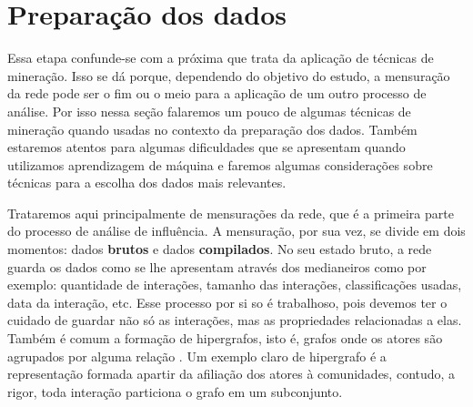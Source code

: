 \chapter{Preparação dos dados}
\label{ch:preparacao}

Essa etapa confunde-se com a próxima que trata da aplicação de técnicas de
mineração. Isso se dá porque, dependendo do objetivo do estudo, a mensuração da
rede pode ser o fim ou o meio para a aplicação de um outro processo de análise.
Por isso nessa seção falaremos um pouco de algumas técnicas de mineração quando
usadas no contexto da preparação dos dados. Também estaremos atentos para
algumas dificuldades que se apresentam quando utilizamos aprendizagem de
máquina e faremos algumas considerações sobre técnicas para a escolha dos dados
mais relevantes.

Trataremos aqui principalmente de mensurações da rede, que é a primeira parte do
processo de análise de influência. A mensuração, por sua vez, se divide em dois
momentos: dados \textbf{brutos} e dados \textbf{compilados}. No seu estado bruto,
a rede guarda os dados como se lhe apresentam através dos medianeiros como por
exemplo: quantidade de interações, tamanho das interações, classificações usadas,
data da interação, etc. Esse processo por si so é trabalhoso, pois devemos ter o
cuidado de guardar não só as interações, mas as propriedades relacionadas a elas.
Também é comum a formação de hipergrafos, isto é, grafos onde os atores são
agrupados por alguma relação \citep{Breiger1974, Seidman1978}. Um exemplo
claro de hipergrafo é a representação formada apartir da afiliação dos atores à
comunidades, contudo, a rigor, toda interação particiona o grafo em um
subconjunto.
